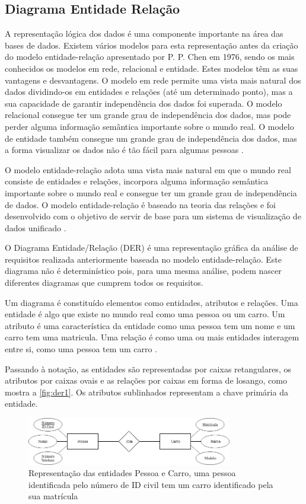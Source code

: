 \documentclass[11pt,twoside,a4paper]{report}
\begin{document}
\subsection{Diagrama Entidade Relação}
\label{subchap:DER}
A representação lógica dos dados é uma componente importante na área das bases de dados. Existem vários modelos para esta representação antes da criação do modelo entidade-relação apresentado por P. P. Chen em 1976, sendo os mais conhecidos os modelos em rede, relacional e entidade. Estes modelos têm as suas vantagens e desvantagens. O modelo em rede permite uma vista mais natural dos dados dividindo-os em entidades e relações (até um determinado ponto), mas a sua capacidade de garantir independência dos dados foi superada. O modelo relacional consegue ter um grande grau de independência dos dados, mas pode perder alguma informação semântica importante sobre o mundo real. O modelo de entidade também consegue um grande grau de independência dos dados, mas a forma visualizar os dados não é tão fácil para algumas pessoas \cite{Chen}.\par
O modelo entidade-relação adota uma vista mais natural em que o mundo real consiste de entidades e relações, incorpora alguma informação semântica importante sobre o mundo real e consegue ter um grande grau de independência de dados. O modelo entidade-relação é baseado na teoria das relações e foi desenvolvido com o objetivo de servir de base para um sistema de visualização de dados unificado \cite{Chen}.\par
O Diagrama Entidade/Relação (DER) é uma representação gráfica da análise de requisitos realizada anteriormente baseada no modelo entidade-relação. Este diagrama não é determinístico pois, para uma mesma análise, podem nascer diferentes diagramas que cumprem todos os requisitos.\par
Um diagrama é constituído elementos como entidades, atributos e relações. Uma entidade é algo que existe no mundo real como uma pessoa ou um carro. Um atributo é uma característica da entidade como uma pessoa tem um nome e um carro tem uma matricula. Uma relação é como uma ou mais entidades interagem entre si, como uma pessoa tem um carro \cite{Chen}.\par 
Passando à notação, as entidades são representadas por caixas retangulares, os atributos por caixas ovais e as relações por caixas em forma de losango, como mostra a \autoref{fig:der1}. Os atributos sublinhados representam a chave primária da entidade.
\begin{figure}[H]
	\begin{center}
		\includegraphics[width=0.8\textwidth]{notacao1} %
		\caption[Representação de entidades, relações e atributos]{Representação das entidades Pessoa e Carro, uma pessoa identificada pelo número de ID civil tem um carro identificado pela sua matrícula}
		\label{fig:der1}
	\end{center}
\end{figure}
\end{document}
